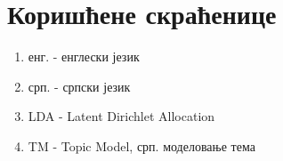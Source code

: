 \chapter{Коришћене скраћенице}
\begin{enumerate}
\item енг. - енглески језик
\item срп. - српски језик
\item LDA - Latent Dirichlet Allocation
\item TM - Topic Model, срп. моделовање тема
\end{enumerate}